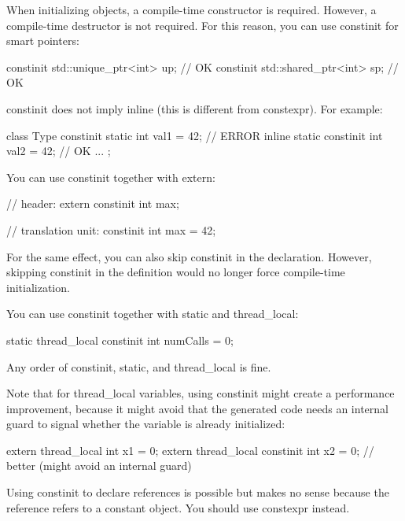When initializing objects, a compile-time constructor is required. However, a compile-time destructor is not required. For this reason, you can use constinit for smart pointers:

\begin{cpp}
constinit std::unique_ptr<int> up; // OK
constinit std::shared_ptr<int> sp; // OK
\end{cpp}

constinit does not imply inline (this is different from constexpr). For example:

\begin{cpp}
class Type {
	constinit static int val1 = 42; // ERROR
	inline static constinit int val2 = 42; // OK
	...
};
\end{cpp}

You can use constinit together with extern:

\begin{cpp}
// header:
extern constinit int max;

// translation unit:
constinit int max = 42;
\end{cpp}

For the same effect, you can also skip constinit in the declaration. However, skipping constinit in the definition would no longer force compile-time initialization.

You can use constinit together with static and thread\_local:

\begin{cpp}
static thread_local constinit int numCalls = 0;
\end{cpp}

Any order of constinit, static, and thread\_local is fine.

Note that for thread\_local variables, using constinit might create a performance improvement, because it might avoid that the generated code needs an internal guard to signal whether the variable is already initialized:

\begin{cpp}
extern thread_local int x1 = 0;
extern thread_local constinit int x2 = 0; // better (might avoid an internal guard)
\end{cpp}

Using constinit to declare references is possible but makes no sense because the reference refers to a constant object. You should use constexpr instead.



